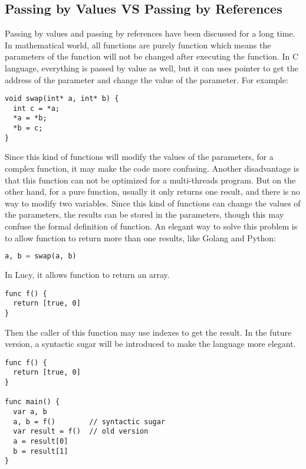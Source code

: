 \subsection{Passing by Values VS Passing by References}
Passing by values and passing by references have been discussed for a long time. In mathematical world, all functions are purely function which means the parameters of the function will not be changed after executing the function. In C language, everything is passed by value as well, but it can uses pointer to get the address of the parameter and change the value of the parameter. For example:
\begin{lstlisting}
void swap(int* a, int* b) {
  int c = *a;
  *a = *b;
  *b = c;
}
\end{lstlisting}
Since this kind of functions will modify the values of the parameters, for a complex function, it may make the code more confusing. Another disadvantage is that this function can not be optimized for a multi-threads program. But on the other hand, for a pure function, usually it only returns one result, and there is no way to modify two variables. Since this kind of functions can change the values of the parameters, the results can be stored in the parameters, though this may confuse the formal definition of function. An elegant way to solve this problem is to allow function to return more than one results, like Golang and Python:
\begin{lstlisting}[language=python]
a, b = swap(a, b)
\end{lstlisting}
In Lucy, it allows function to return an array.
\begin{lstlisting}
func f() {
  return [true, 0]
}
\end{lstlisting}
Then the caller of this function may use indexes to get the result. In the future version, a syntactic sugar will be introduced to make the language more elegant.
\begin{lstlisting}
func f() {
  return [true, 0]
}

func main() {
  var a, b
  a, b = f()        // syntactic sugar
  var result = f()  // old version
  a = result[0]
  b = result[1]
}
\end{lstlisting}


